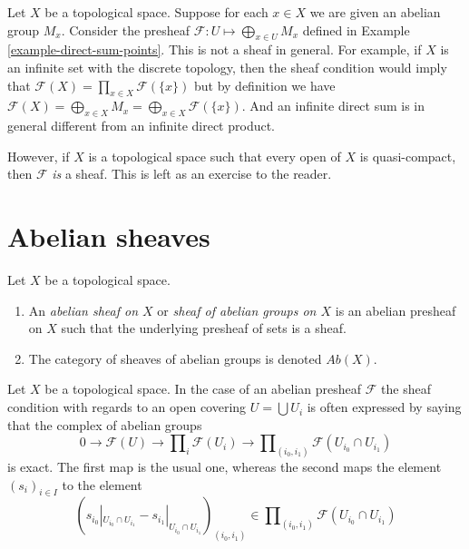 \begin{example}
\label{example-direct-sum-points-not-sheaf}
Let $X$ be a topological space.
Suppose for each $x\in X$ we are given an abelian group $M_x$.
Consider the presheaf $\mathcal{F} : U \mapsto \bigoplus_{x \in U} M_x$
defined in Example \ref{example-direct-sum-points}. This
is not a sheaf in general. For example, if $X$ is an infinite set
with the discrete topology, then the sheaf condition 
would imply that $\mathcal{F}(X) = \prod_{x\in X} \mathcal{F}(\{x\})$
but by definition we have $\mathcal{F}(X)
= \bigoplus_{x \in X} M_x = \bigoplus_{x \in X} \mathcal{F}(\{x\})$.
And an infinite direct sum is in general different from an infinite
direct product.

\medskip\noindent
However, if $X$ is a topological space such that every open
of $X$ is quasi-compact, then $\mathcal{F}$ {\it is} a sheaf.
This is left as an exercise to the reader.
\end{example}



\section{Abelian sheaves}
\label{section-abelian-sheaves}

\begin{definition}
\label{definition-abelian-sheaf}
Let $X$ be a topological space.
\begin{enumerate}
\item An {\it abelian sheaf on $X$} or
{\it sheaf of abelian groups on $X$}
is an abelian presheaf on $X$ such that the underlying presheaf of
sets is a sheaf.
\item The category of sheaves of abelian groups
is denoted $\textit{Ab}(X)$.
\end{enumerate}
\end{definition}

\noindent
Let $X$ be a topological space.
In the case of an abelian presheaf $\mathcal{F}$ the sheaf
condition with regards to an open covering $U = \bigcup U_i$
is often expressed by saying that the complex of abelian groups
$$
0 \to \mathcal{F}(U)
\to \prod\nolimits_i \mathcal{F}(U_i)
\to \prod\nolimits_{(i_0, i_1)} \mathcal{F}(U_{i_0} \cap U_{i_1})
$$
is exact. The first map is the usual one, whereas the second
maps the element $(s_i)_{i \in I}$ to the element
$$
(
s_{i_0}|_{U_{i_0} \cap U_{i_1}} -
s_{i_1}|_{U_{i_0} \cap U_{i_1}}
)_{(i_0, i_1)}
\in \prod\nolimits_{(i_0, i_1)} \mathcal{F}(U_{i_0} \cap U_{i_1})
$$

